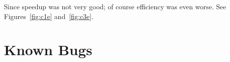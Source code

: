 \documentclass{acm_proc_article-sp}
\begin{document}
Since speedup was not very good; of course efficiency was even worse. See
Figures~\ref{fig:c1e} and~\ref{fig:c3e}.


%
%
%
%
%
%
%
%
%
%









\section{Known Bugs}
\end{document}
